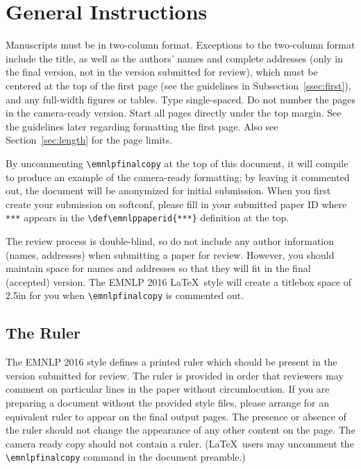 \documentclass[11pt,letterpaper]{article}
\def\emnlppaperid{***}
\begin{document}
\section{General Instructions}

Manuscripts must be in two-column format.  Exceptions to the two-column
format include the title, as well as the authors' names and complete
addresses (only in the final version, not in the version submitted for
review), which must be centered at the top of the first page (see the
guidelines in Subsection~\ref{ssec:first}), and any full-width figures or
tables.  Type single-spaced.  Do not number the pages in the camera-ready
version. Start all pages directly under the top margin.  See the guidelines
later regarding formatting the first page.  Also see 
Section~\ref{sec:length} for the page limits.

By uncommenting {\small\verb|\emnlpfinalcopy|} at the top of this document,
it will compile to produce an example of the camera-ready formatting; by
leaving it commented out, the document will be anonymized for initial
submission.  When you first create your submission on softconf, please fill
in your submitted paper ID where {\small\verb|***|} appears in the
{\small\verb|\def\emnlppaperid{***}|} definition at the top.

The review process is double-blind, so do not include any author information
(names, addresses) when submitting a paper for review. However, you should
maintain space for names and addresses so that they will fit in the final
(accepted) version.  The EMNLP 2016 \LaTeX\ style will create a titlebox
space of 2.5in for you when {\small\verb|\emnlpfinalcopy|} is commented out.

\subsection{The Ruler}
The EMNLP 2016 style defines a printed ruler which should be present in the
version submitted for review.  The ruler is provided in order that
reviewers may comment on particular lines in the paper without
circumlocution.  If you are preparing a document without the provided
style files, please arrange for an equivalent ruler to
appear on the final output pages.  The presence or absence of the ruler
should not change the appearance of any other content on the page.  The
camera ready copy should not contain a ruler. (\LaTeX\ users may uncomment
the {\small\verb|\emnlpfinalcopy|} command in the document preamble.)  
\end{document}
